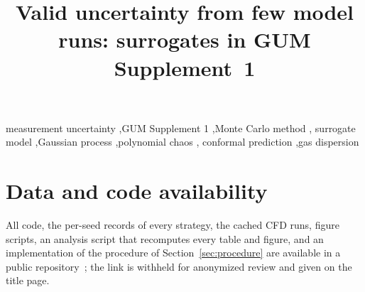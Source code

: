 \documentclass[preprint,11pt,a4paper]{elsarticle}
\newcommand\repocite{\cite{repoanon}}
\begin{document}
\begin{frontmatter}
\title{Valid uncertainty from few model runs: surrogates in GUM Supplement~1}

\begin{abstract}

\end{abstract}

\begin{keyword}
measurement uncertainty \sep GUM Supplement 1 \sep Monte Carlo method \sep
surrogate model \sep Gaussian process \sep polynomial chaos \sep
conformal prediction \sep gas dispersion
\end{keyword}
\end{frontmatter}



\section*{Data and code availability}
All code, the per-seed records of every strategy, the cached CFD runs,
figure scripts, an analysis script that recomputes every table and figure,
and an implementation of the procedure of Section~\ref{sec:procedure} are
available in a public repository~\repocite; the link is withheld for
anonymized review and given on the title page.



\end{document}
